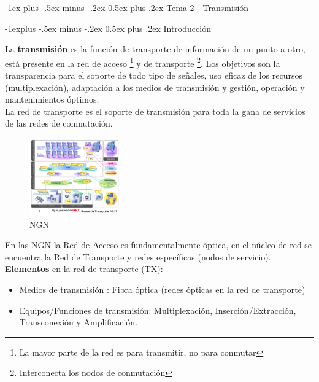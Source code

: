\documentclass[10pt,portrait, twocolumn]{article}
\makeatletter
\renewcommand{\section}{\@startsection{section}{1}{0mm}%
                                {-1ex plus -.5ex minus -.2ex}%
                                {0.5ex plus .2ex}%
                                {\normalfont\large\bfseries}}
\renewcommand{\subsection}{\@startsection{subsection}{2}{0mm}%
                                {-1explus -.5ex minus -.2ex}%
                                {0.5ex plus .2ex}%
                                {\normalfont\normalsize\bfseries}}
\makeatother
\begin{document}
\hrulefill
	
\begin{center}
\section{\underline{Tema 2 - Transmisión}}
\end{center}

\subsection{Introducción}

La \textbf{transmisión} es la función de transporte de información de un punto a otro, está presente en la red de acceso \footnote{La mayor parte de la red es para transmitir, no para conmutar} y de transporte \footnote{Interconecta los nodos de conmutación}. Los objetivos son la transparencia para el soporte de todo tipo de señales, uso eficaz de los recursos (multiplexación), adaptación a los medios de transmisión y gestión, operación y mantenimientos óptimos.\\

La red de transporte es el soporte de transmisión para toda la gana de servicios de las redes de conmutación.

\begin{figure}[h]
	\centering
     \includegraphics[width=0.35\textwidth]{NGN}
      \caption{NGN}
      \label{fig:Regiones de frecuencias}
  \end{figure}

En las NGN la Red de Acceso es fundamentalmente óptica, en el núcleo de red se encuentra la Red de Transporte y redes específicas (nodos de servicio).\\

\textbf{Elementos} en la red de transporte (TX):

	\begin{itemize}
	\item Medios de transmisión : Fibra óptica (redes ópticas en la red de transporte)
	\item Equipos/Funciones de transmisión: Multiplexación, Inserción/Extracción, Transconexión y Amplificación.
	\end{itemize}
	
\end{document}
